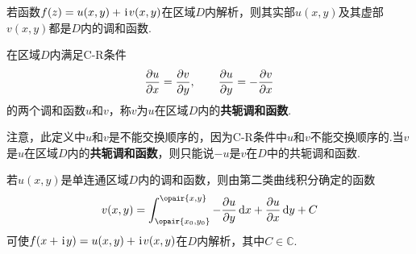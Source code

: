 \begin{theorem}
若函数\(f(z)=u(x,y)+\kern1pt\mathrm{i}\kern1pt v(x,y)\)在区域\(D\)内解析，则其实部\(u(x,y)\)及其虚部\(v(x,y)\)都是\(D\)内的调和函数.
\end{theorem}

\begin{definition}
在区域\(D\)内满足C-R条件\[
\pdv{u}{x}=\pdv{v}{y}, \qquad \pdv{u}{y}=-\pdv{v}{x}
\]的两个调和函数\(u\)和\(v\)，称\(v\)为\(u\)在区域\(D\)内的\textbf{共轭调和函数}.
\end{definition}
注意，此定义中\(u\)和\(v\)是不能交换顺序的，因为C-R条件中\(u\)和\(v\)不能交换顺序的.当\(v\)是\(u\)在区域\(D\)内的\textbf{共轭调和函数}，则只能说\(-u\)是\(v\)在\(D\)中的共轭调和函数.

\begin{theorem}
若\(u(x,y)\)是单连通区域\(D\)内的调和函数，则由第二类曲线积分确定的函数\[
v(x,y)=\int_{\opair{x_0,y_0}}^{\opair{x,y}}
-\pdv{u}{y} \dd{x} + \pdv{u}{x} \dd{y} + C
\]可使\(f(x+\kern1pt\mathrm{i}\kern1pt y)=u(x,y)+\kern1pt\mathrm{i}\kern1pt v(x,y)\)在\(D\)内解析，其中\(C\in\mathbb{C}\).
\end{theorem}
